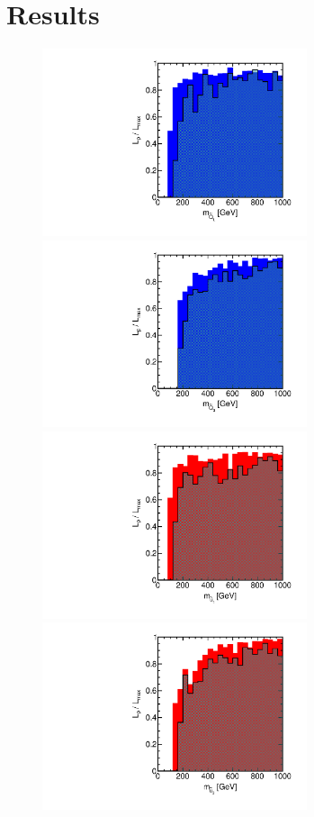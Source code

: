 \section{Results}
\label{sec:results}

\begin{figure}[htbp]
\begin{center}
\includegraphics[height=5.5cm]{figs/fig_m_Q_L.pdf} 
\includegraphics[height=5.5cm]{figs/fig_m_Q_3.pdf} \\
\includegraphics[height=5.5cm]{figs/fig_m_u_1.pdf}
\includegraphics[height=5.5cm]{figs/fig_m_u_3.pdf} \\

\end{center}
\end{figure}
